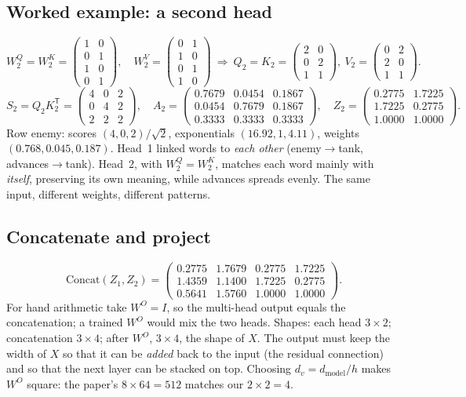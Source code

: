 \documentclass[11pt]{article}
\begin{document}
\subsection{Worked example: a second head}
\[W_2^Q=W_2^K=\begin{pmatrix}1&0\\0&1\\1&0\\0&1\end{pmatrix},\quad W_2^V=\begin{pmatrix}0&1\\1&0\\0&1\\1&0\end{pmatrix}\ \Rightarrow\ Q_2=K_2=\begin{pmatrix}2&0\\0&2\\1&1\end{pmatrix},\ V_2=\begin{pmatrix}0&2\\2&0\\1&1\end{pmatrix}.\]
\[S_2=Q_2K_2^{\mathsf T}=\begin{pmatrix}4&0&2\\0&4&2\\2&2&2\end{pmatrix},\quad A_2=\begin{pmatrix}0.7679&0.0454&0.1867\\0.0454&0.7679&0.1867\\0.3333&0.3333&0.3333\end{pmatrix},\quad Z_2=\begin{pmatrix}0.2775&1.7225\\1.7225&0.2775\\1.0000&1.0000\end{pmatrix}.\]
Row enemy: scores $(4,0,2)/\sqrt2$, exponentials $(16.92,1,4.11)$, weights $(0.768,0.045,0.187)$. Head~1 linked words to \emph{each other} (enemy$\to$tank, advances$\to$tank). Head~2, with $W_2^Q=W_2^K$, matches each word mainly with \emph{itself}, preserving its own meaning, while advances spreads evenly. The same input, different weights, different patterns.

\subsection{Concatenate and project}
\[\text{Concat}(Z_1,Z_2)=\begin{pmatrix}0.2775&1.7679&0.2775&1.7225\\1.4359&1.1400&1.7225&0.2775\\0.5641&1.5760&1.0000&1.0000\end{pmatrix}.\]
For hand arithmetic take $W^O=I$, so the multi-head output equals the concatenation; a trained $W^O$ would mix the two heads. Shapes: each head $3\times2$; concatenation $3\times4$; after $W^O$, $3\times4$, the shape of $X$. The output must keep the width of $X$ so that it can be \emph{added} back to the input (the residual connection) and so that the next layer can be stacked on top. Choosing $d_v=d_{\text{model}}/h$ makes $W^O$ square: the paper's $8\times64=512$ matches our $2\times2=4$.
\end{document}
